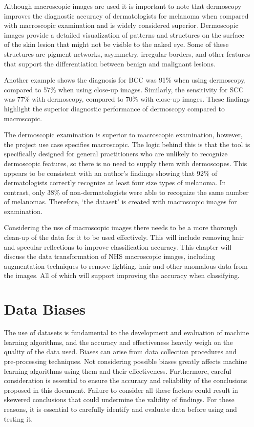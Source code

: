 Although macroscopic images are used it is important to note that dermoscopy improves the diagnostic accuracy of dermatologists for melanoma when compared with macroscopic examination\cite{Wolner2017} and is widely considered superior\cite{Thiers2009}. Dermoscopic images provide a detailed visualization of patterns and structures on the surface of the skin lesion that might not be visible to the naked eye\cite{Thiers2009}. Some of these structures are pigment networks, asymmetry, irregular borders, and other features that support the differentiation between benign and malignant lesions\cite{Thiers2009}. 

Another example shows the diagnosis for BCC was 91\% when using dermoscopy, compared to 57\% when using close-up images\cite{Dascalu2022}. Similarly, the sensitivity for SCC was 77\% with dermoscopy, compared to 70\% with close-up images\cite{Dascalu2022}. These findings highlight the superior diagnostic performance of dermoscopy compared to macroscopic.

The dermoscopic examination is superior to macroscopic examination, however, the project use case specifies macroscopic. The logic behind this is that the tool is specifically designed for general practitioners who are unlikely to recognize dermoscopic features, so there is no need to supply them with dermoscopes. This appears to be consistent with an author's findings showing that 92\% of dermatologists correctly recognize at least four size types of melanoma. In contrast, only 38\% of non-dermatologists were able to recognize the same number of melanomas\cite{Tae2019}. Therefore, `the dataset' is created with macroscopic images for examination.

Considering the use of macroscopic images there needs to be a more thorough clean-up of the data for it to be used effectively. This will include removing hair and specular reflections to improve classification accuracy. This chapter will discuss the data transformation of NHS macroscopic images, including augmentation techniques to remove lighting, hair and other anomalous data from the images. All of which will support improving the accuracy when classifying.

\section{Data Biases}
The use of datasets is fundamental to the development and evaluation of machine learning algorithms, and the accuracy and effectiveness heavily weigh on the quality of the data used. Biases can arise from data collection procedures and pre-processing techniques. Not considering possible biases greatly affects machine learning algorithms using them and their effectiveness. Furthermore, careful consideration is essential to ensure the accuracy and reliability of the conclusions proposed in this document. Failure to consider all these factors could result in skewered conclusions that could undermine the validity of findings. For these reasons, it is essential to carefully identify and evaluate data before using and testing it.

